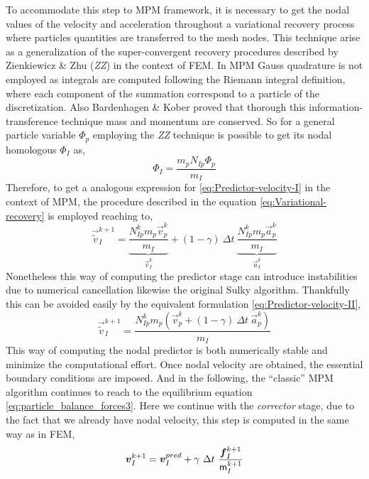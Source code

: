 To accommodate this step to MPM framework, it is necessary to get
the nodal values of the velocity and acceleration throughout a variational
recovery process where particles quantities are transferred to the
mesh nodes. This technique arise as a generalization of the super-convergent recovery
procedures described by Zienkiewicz \& Zhu \cite{ZZ1992_I} (\textit{ZZ})
in the context of FEM. In MPM Gauss quadrature is not employed as
integrals are computed following the Riemann integral definition,
where each component of the summation correspond to a particle of the
discretization. Also Bardenhagen \& Kober \cite{Bardenhagen2004}
proved that thorough this information-transference technique mass and momentum are conserved. So for a general particle variable $\Phi_p$ employing the
\textit{ZZ} technique is possible to get its nodal homologous $\Phi_I$  as,
\begin{equation}
  \label{eq:Variational-recovery}
   \Phi_I = \frac{m_p N_{Ip} \Phi_p}{m_I}
 \end{equation}
 Therefore, to get a analogous expression for
 \eqref{eq:Predictor-velocity-I} in the context of MPM, the
 procedure described in the equation \eqref{eq:Variational-recovery}
 is employed reaching to,
 \begin{equation}
   \label{eq:Predictor-velocity-II}
   \vec{\tilde{v}}_I^{k+1} = \underbrace{\frac{N_{Ip}^{k} m_p
       \vec{v}_p^k}{m_I}}_{\vec{v}_I^{k}} + (1 - \gamma)\ \Delta t\  \underbrace{\frac{N_{Ip}^{k} m_p \vec{a}_p^k}{m_I}}_{\vec{a}_I^{k}}
 \end{equation}
Nonetheless this way of computing the predictor stage can introduce
instabilities due to numerical cancellation likewise the original
Sulky algorithm. Thankfully this can be avoided easily by the
equivalent formulation \eqref{eq:Predictor-velocity-II}, 
\begin{equation}
  \label{eq:Predictor-velocity-II}
  \vec{\tilde{v}}_I^{k+1} = \frac{ N_{Ip}^{k} m_p (\vec{v}_p^k + (1 - \gamma)\ \Delta t\ \vec{a}_p^k)}{m_I}
\end{equation}
This way of computing the nodal predictor is both numerically stable
and minimize the computational effort. Once nodal velocity are
obtained, the essential boundary conditions are imposed. And in the
following, the ``classic'' MPM algorithm continues to reach to the
equilibrium equation \eqref{eq:particle_balance_forces3}. Here we
continue with the \textit{corrector} stage, due to the fact that we
already have nodal velocity, this step is computed in the same way as
in FEM,
\begin{equation}
  \label{eq:Corrector-velocity}
  \vec{v}_{I}^{k+1} = \vec{v}_{I}^{pred} + \gamma\ \Delta t\ \frac{\vec{f}_{I}^{k+1}}{\tens{m}_I^{k+1}}
\end{equation}
